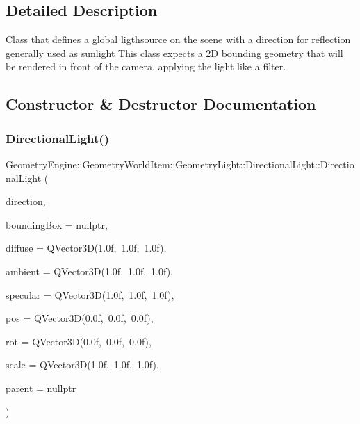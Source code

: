 \subsection{Detailed Description}
Class that defines a global ligthsource on the scene with a direction for reflection generally used as sunlight This class expects a 2D bounding geometry that will be rendered in front of the camera, applying the light like a filter. 

\subsection{Constructor \& Destructor Documentation}
\mbox{\label{class_geometry_engine_1_1_geometry_world_item_1_1_geometry_light_1_1_directional_light_ab11752fa06e7f257334bf12cab849139}} 
\subsubsection{\texorpdfstring{DirectionalLight()}{DirectionalLight()}\hspace{0.1cm}{\footnotesize\ttfamily [1/2]}}
{\footnotesize\ttfamily Geometry\+Engine\+::\+Geometry\+World\+Item\+::\+Geometry\+Light\+::\+Directional\+Light\+::\+Directional\+Light (\begin{DoxyParamCaption}\item[{const Q\+Vector3D \&}]{direction,  }\item[{\mbox{\hyperlink{class_geometry_engine_1_1_geometry_world_item_1_1_geometry_item_1_1_geometry_item}{Geometry\+Item\+::\+Geometry\+Item}} $\ast$}]{bounding\+Box = {\ttfamily nullptr},  }\item[{const Q\+Vector3D \&}]{diffuse = {\ttfamily QVector3D(1.0f,~1.0f,~1.0f)},  }\item[{const Q\+Vector3D \&}]{ambient = {\ttfamily QVector3D(1.0f,~1.0f,~1.0f)},  }\item[{const Q\+Vector3D \&}]{specular = {\ttfamily QVector3D(1.0f,~1.0f,~1.0f)},  }\item[{const Q\+Vector3D \&}]{pos = {\ttfamily QVector3D(0.0f,~0.0f,~0.0f)},  }\item[{const Q\+Vector3D \&}]{rot = {\ttfamily QVector3D(0.0f,~0.0f,~0.0f)},  }\item[{const Q\+Vector3D \&}]{scale = {\ttfamily QVector3D(1.0f,~1.0f,~1.0f)},  }\item[{\mbox{\hyperlink{class_geometry_engine_1_1_geometry_world_item_1_1_world_item}{World\+Item}} $\ast$}]{parent = {\ttfamily nullptr} }\end{DoxyParamCaption})}

